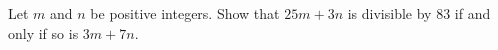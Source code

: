 Let $m$ and $n$ be positive integers. Show that $25m+ 3n$ is divisible by $83$ if and only if so is $3m+ 7n$.